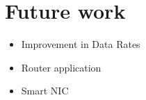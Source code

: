 \documentclass[12pt]{report}
\begin{document}
\section{Future work}
	\begin{itemize}
		\item Improvement in Data Rates
		\item  Router application
		\item  Smart NIC
	\end{itemize}


%
%
\clearpage
{}
\begin{thebibliography}{99}


\end{thebibliography}
\end{document}
